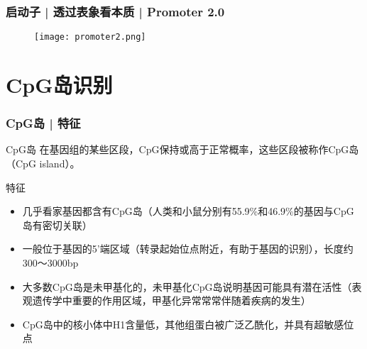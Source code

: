 
\begin{frame}
  \frametitle{启动子 | 透过表象看本质 | Promoter 2.0}
  \begin{figure}
    \centering
    \texttt{[image: promoter2.png]}
  \end{figure}
\end{frame}

\section{CpG岛识别}
\begin{frame}
  \frametitle{CpG岛 | 特征}
  \begin{block}{\alert{CpG岛}}
    在基因组的某些区段，CpG保持或高于正常概率，这些区段被称作CpG岛（CpG island）。
  \end{block}
  \pause
  \begin{block}{特征}
    \begin{itemize}
      \item 几乎看家基因都含有CpG岛（人类和小鼠分别有55.9\%和46.9\%的基因与CpG岛有密切关联）
      \item 一般位于基因的5'端区域（转录起始位点附近，有助于基因的识别），长度约300～3000bp
      \item 大多数CpG岛是未甲基化的，未甲基化CpG岛说明基因可能具有潜在活性（表观遗传学中重要的作用区域，甲基化异常常常伴随着疾病的发生）
      \item CpG岛中的核小体中H1含量低，其他组蛋白被广泛乙酰化，并具有超敏感位点
    \end{itemize}
  \end{block}
\end{frame}

